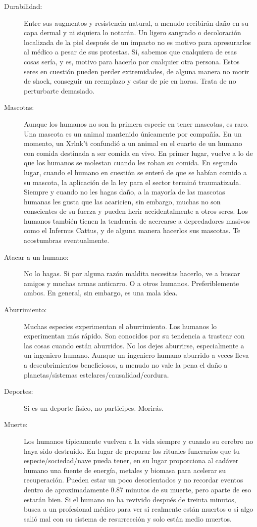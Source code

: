\documentclass[spanish,12pt,a4paper, oneside]{book}
\begin{document}
\begin{description}
        \item[Durabilidad:] Entre sus augmentos y resistencia natural, a menudo recibirán daño en su capa dermal y ni siquiera lo notarán. Un ligero sangrado o decoloración localizada de la piel después de un impacto no es motivo para apresurarlos al médico a pesar de sus protestas. Sí, sabemos que cualquiera de esas cosas sería, y es, motivo para hacerlo por cualquier otra persona. Estos seres en cuestión pueden perder extremidades, de alguna manera no morir de shock, conseguir un reemplazo y estar de pie en horas. Trata de no perturbarte demasiado.

        \item[Mascotas:] Aunque los humanos no son la primera especie en tener mascotas, es raro. Una mascota es un animal mantenido únicamente por compañía. En un momento, un Xrlnk't confundió a un animal en el cuarto de un humano con comida destinada a ser comida en vivo. En primer lugar, vuelve a lo de que los humanos se molestan cuando les roban su comida. En segundo lugar, cuando el humano en cuestión se enteró de que se habían comido a su mascota, la aplicación de la ley para el sector terminó traumatizada. Siempre y cuando no les hagas daño, a la mayoría de las mascotas humanas les gusta que las acaricien, sin embargo, muchas no son conscientes de su fuerza y pueden herir accidentalmente a otros seres. Los humanos también tienen la tendencia de acercarse a depredadores masivos como el Infernus Cattus, y de alguna manera hacerlos sus mascotas. Te acostumbras eventualmente.

        \item[Atacar a un humano:] No lo hagas. Si por alguna razón maldita necesitas hacerlo, ve a buscar amigos y muchas armas anticarro. O a otros humanos. Preferiblemente ambos. En general, sin embargo, es una mala idea.

        \item[Aburrimiento:] Muchas especies experimentan el aburrimiento. Los humanos lo experimentan más rápido. Son conocidos por su tendencia a trastear con las cosas cuando están aburridos. No los dejes aburrirse, especialmente a un ingeniero humano. Aunque un ingeniero humano aburrido a veces lleva a descubrimientos beneficiosos, a menudo no vale la pena el daño a planetas/sistemas estelares/causalidad/cordura.

        \item[Deportes:] Si es un deporte físico, no participes. Morirás.

        \item[Muerte:] Los humanos típicamente vuelven a la vida siempre y cuando su cerebro no haya sido destruido. En lugar de preparar los rituales funerarios que tu especie/sociedad/nave pueda tener, en su lugar proporciona al cadáver humano una fuente de energía, metales y biomasa para acelerar su recuperación. Pueden estar un poco desorientados y no recordar eventos dentro de aproximadamente 0.87 minutos de su muerte, pero aparte de eso estarán bien. Si el humano no ha revivido después de treinta minutos, busca a un profesional médico para ver si realmente están muertos o si algo salió mal con su sistema de resurrección y solo están medio muertos.


\end{description}
\end{document}
